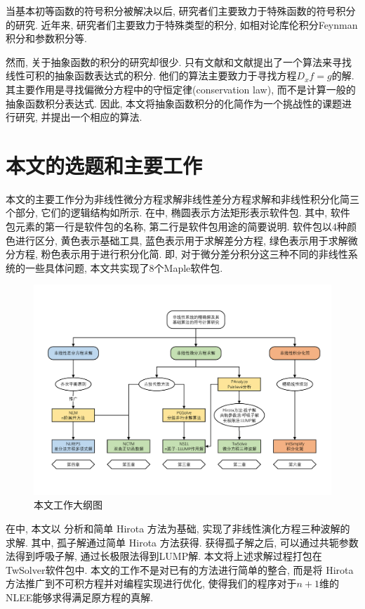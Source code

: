 当基本初等函数的符号积分被解决以后, 研究者们主要致力于特殊函数的符号积分的研究\citep{cherry1985,cherry1986,bertrand1994,jeffrey1997}. 近年来, 研究者们主要致力于特殊类型的积分, 如相对论库伦积分\citep{paule2012,paule2013}\D Feynman积分\citep{blumlein2012,smirnov2015}和参数积分\citep{raab2016}等.

然而, 关于抽象函数的积分的研究却很少. 只有文献\cite{deconinck2009}和文献\cite{poole2010}提出了一个算法来寻找线性可积的抽象函数表达式的积分. 他们的算法主要致力于寻找方程$D_x f=g$的解. 其主要作用是寻找偏微分方程中的守恒定律(conservation law)\citep{poole2011}, 而不是计算一般的抽象函数积分表达式. 因此, 本文将抽象函数积分的化简作为一个挑战性的课题进行研究, 并提出一个相应的算法.

\section{本文的选题和主要工作}
本文的主要工作分为非线性微分方程求解\D 非线性差分方程求解和非线性积分化简三个部分, 它们的逻辑结构如所示. 在中, 椭圆表示方法\D 矩形表示软件包. 其中, 软件包元素的第一行是软件包的名称, 第二行是软件包用途的简要说明. 软件包以4种颜色进行区分, 黄色表示基础工具, 蓝色表示用于求解差分方程, 绿色表示用于求解微分方程, 粉色表示用于进行积分化简. 即, 对于微分\D 差分\D 积分这三种不同的非线性系统的一些具体问题, 本文共实现了8个Maple软件包.

\begin{figure}[htbp]
\includegraphics[width=\textwidth]{fig/outline.pdf}
\caption{本文工作大纲图}\label{outline}
\end{figure}

在中, 本文以 \Painleve{} 分析和简单 Hirota 方法为基础, 实现了非线性演化方程三种波解的求解. 其中, 孤子解通过简单 Hirota 方法获得. 获得孤子解之后, 可以通过共轭参数法得到呼吸子解, 通过长极限法得到LUMP解. 本文将上述求解过程打包在TwSolver软件包中. 本文的工作不是对已有的方法进行简单的整合, 而是将 Hirota 方法推广到不可积方程并对编程实现进行优化, 使得我们的程序对于$n+1$维的NLEE能够求得满足原方程的真解. 

